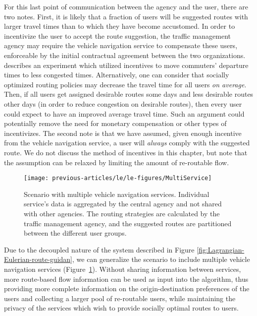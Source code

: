 For this last point of communication between the agency and the user,
there are two notes. First, it is likely that a fraction of users
will be suggested routes with larger travel times than to which they
have become accustomed. In order to incentivize the user to accept
the route suggestion, the traffic management agency may require the
vehicle navigation service to compensate these users, enforceable
by the initial contractual agreement between the two organizations.
\cite{Merugu2009} describes an experiment which utilized incentives
to move commuters' departure times to less congested times. Alternatively,
one can consider that socially optimized routing policies may decrease
the travel time for all users \emph{on average}. Then, if all users
get assigned desirable routes some days and less desirable routes
other days (in order to reduce congestion on desirable routes), then
every user could expect to have an improved average travel time. Such
an argument could potentially remove the need for monetary compensation
or other types of incentivizes. The second note is that we have assumed,
given enough incentive from the vehicle navigation service, a user
will \emph{always} comply with the suggested route. We do not discuss
the method of incentives in this chapter, but note that the assumption
can be relaxed by limiting the amount of re-routable flow.
\begin{figure}[h]
\centering
\texttt{[image: previous-articles/le/le-figures/MultiService]}%
\caption{Scenario with multiple vehicle navigation services. Individual service's
data is aggregated by the central agency and not shared with other
agencies. The routing strategies are calculated by the traffic management
agency, and the suggested routes are partitioned between the different
user groups.}
\label{fig:Scenario-with-multiple}
\end{figure}


Due to the decoupled nature of the system described in Figure \ref{fig:Lagrangian-Eulerian-route-guidan},
we can generalize the scenario to include multiple vehicle navigation
services (Figure~\ref{fig:Scenario-with-multiple}). Without sharing
information between services, more route-based flow information can
be used as input into the algorithm, thus providing more complete
information on the origin-destination preferences of the users and
collecting a larger pool of re-routable users, while maintaining the
privacy of the services which wish to provide socially optimal routes
to users.


